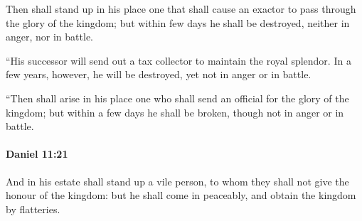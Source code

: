 			\begin{versebox}
					\item[BHS] 
					\item[LXX] 
					\item[ASV] Then shall stand up in his place one that shall cause an exactor to pass through the glory of the kingdom; but within few days he shall be destroyed, neither in anger, nor in battle.
					\item[NIV] “His successor will send out a tax collector to maintain the royal splendor. In a few years, however, he will be destroyed, yet not in anger or in battle.
					\item[NRSV] “Then shall arise in his place one who shall send an official for the glory of the kingdom; but within a few days he shall be broken, though not in anger or in battle.
			\end{versebox}

		\paragraph{Daniel 11:21} %
			\label{DANIEL-11-21}

			And in his estate shall stand up a vile person, to whom they shall not give the honour of the kingdom: but he shall come in peaceably, and obtain the kingdom by flatteries.

